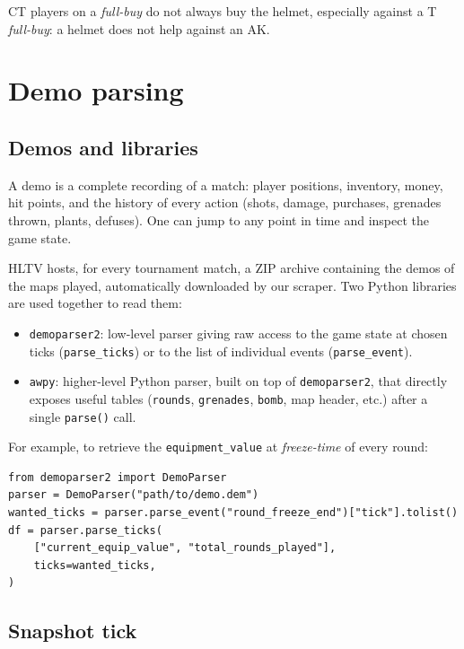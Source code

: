 CT players on a \emph{full-buy} do not always buy the helmet,
especially against a T \emph{full-buy}: a helmet does not help against
an AK.

\section{Demo parsing}
\label{annex:parsing}

\subsection{Demos and libraries}

A demo is a complete recording of a match: player positions,
inventory, money, hit points, and the history of every action
(shots, damage, purchases, grenades thrown, plants, defuses). One
can jump to any point in time and inspect the game state.

HLTV hosts, for every tournament match, a ZIP archive containing
the demos of the maps played, automatically downloaded by our
scraper. Two Python libraries are used together to read them:
\begin{itemize}
  \item \texttt{demoparser2}: low-level parser giving raw access to
    the game state at chosen ticks (\texttt{parse\_ticks}) or to the
    list of individual events (\texttt{parse\_event}).
  \item \texttt{awpy}: higher-level Python parser, built on top of
    \texttt{demoparser2}, that directly exposes useful tables
    (\texttt{rounds}, \texttt{grenades}, \texttt{bomb}, map header,
    etc.) after a single \texttt{parse()} call.
\end{itemize}

For example, to retrieve the \texttt{equipment\_value} at
\emph{freeze-time} of every round:

\begin{lstlisting}
from demoparser2 import DemoParser
parser = DemoParser("path/to/demo.dem")
wanted_ticks = parser.parse_event("round_freeze_end")["tick"].tolist()
df = parser.parse_ticks(
    ["current_equip_value", "total_rounds_played"],
    ticks=wanted_ticks,
)
\end{lstlisting}

\subsection{Snapshot tick}
\label{annex:snapshot}

